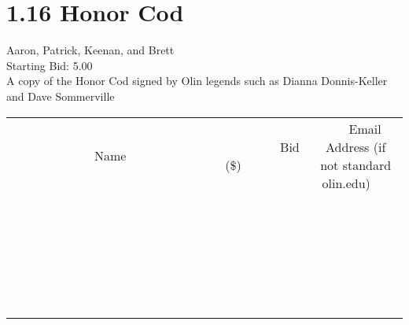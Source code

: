 \documentclass[11pt]{article}
\begin{document}
					\section*{1.16 Honor Cod}
					Aaron, Patrick, Keenan, and Brett \\
					Starting Bid: 5.00 \\
					A copy of the Honor Cod signed by Olin legends such as Dianna Donnis-Keller and Dave Sommerville \\
					[6ex]
					\begin{tabular}{c c c}
						~~~~~~~~~~~~~Name~~~~~~~~~~~~~ & ~~~~~~~~~Bid (\$)~~~~~~~~~ & ~~~Email Address (if not standard olin.edu)~~~ \\
				
 & & \\
\hline
 & & \\
\hline
 & & \\
\hline
 & & \\
\hline
 & & \\
\hline
 & & \\
\hline
 & & \\
\hline
 & & \\
\hline
 & & \\
\hline
 & & \\
\hline
 & & \\
\hline
 & & \\
\hline
 & & \\
\hline
 & & \\
\hline
 & & \\
\hline
 & & \\
\hline
 & & \\
\hline
 & & \\
\hline
 & & \\
\hline
 & & \\
\hline
 & & \\
\hline
 & & \\
\hline
 & & \\
\hline
 & & \\
\hline
 & & \\
\hline
 & & \\
\hline
					\end{tabular}
					\clearpage
				
\end{document}

